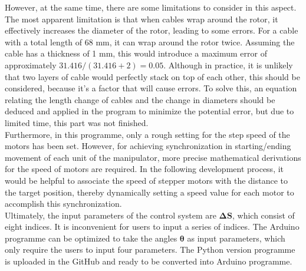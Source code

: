 However, at the same time, there are some limitations to consider in this aspect. The most apparent limitation is that 
when cables wrap around the rotor, it effectively increases the diameter of the rotor, leading to some errors. For a 
cable with a total length of 68 mm, it can wrap around the rotor twice. Assuming the cable has a thickness of 1 mm, this 
would introduce a maximum error of approximately $ 31.416 / (31.416 + 2) = 0.05 $. Although in practice, it is unlikely 
that two layers of cable would perfectly stack on top of each other, this should be considered, because it's a factor 
that will cause errors. To solve this, an equation relating the length change of cables and the change in diameters 
should be deduced and applied in the program to minimize the potential error, but due to limited time, this part was 
not finished.\\
Furthermore, in this programme, only a rough setting for the step speed of the motors has been set. However, for 
achieving synchronization in starting/ending movement of each unit of the manipulator, more precise mathematical 
derivations for the speed of motors are required. In the following development process, it would be helpful to 
associate the speed of stepper motors with the distance to the target position, thereby dynamically setting a 
speed value for each motor to accomplish this synchronization. \\
Ultimately, the input parameters of the control system are $\boldsymbol{\Delta S}$, which consist of eight indices. 
It is inconvenient for users to input a series of indices. The Arduino programme can be optimized to take the 
angles $\boldsymbol{\theta}$ as input parameters, which only require the users to input four parameters. The Python 
version programme is uploaded in the GitHub and ready to be converted into Arduino programme.
